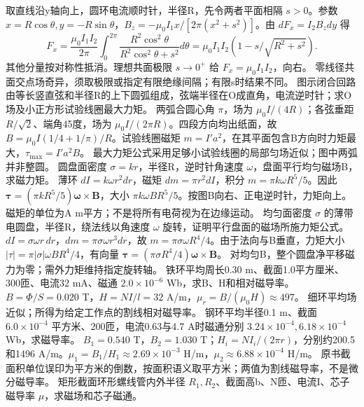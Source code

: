 \workings 取直线沿y轴向上，圆环电流顺时针，半径R，先令两者平面相隔 $s>0$。参数 $x=R\cos\theta,y=-R\sin\theta$，$B_z=-\mu_0I_1x/[2\pi(x^2+s^2)]$。由 $dF_x=I_2B_zdy$ 得
\[
F_x=\frac{\mu_0I_1I_2}{2\pi}\int_0^{2\pi}
\frac{R^2\cos^2\theta}{R^2\cos^2\theta+s^2}d\theta
=\mu_0I_1I_2(1-s/\sqrt{R^2+s^2}).
\]
其他分量按对称性抵消。理想共面极限 $s\to0^+$ 给 $F_x=\mu_0I_1I_2$，向右。
\crosscheck 零线径共面交点场奇异，须取极限或指定有限绝缘间隔；有限s时结果不同。
\problemtext 图示闭合回路由等长竖直弦和半径R的上下圆弧组成，弦端半径在O成直角，电流逆时针；求O场及小正方形试验线圈最大力矩。
\workings 两弧合圆心角 $\pi$，场为 $\mu_0I/(4R)$；各弦垂距 $R/\sqrt2$、端角45度，场为 $\mu_0I/(2\pi R)$。四段方向均出纸面，故 $B=\mu_0I(1/4+1/\pi)/R$。试验线圈磁矩 $m=I'a^2$，在其平面包含B方向时力矩最大，$\tau_{\max}=I'a^2B$。
\crosscheck 最大力矩公式采用足够小试验线圈的局部匀场近似；图中两弧并非整圆。
\problemtext 圆盘面密度 $\sigma=kr$，半径R，逆时针角速度 $\omega$，盘面平行均匀磁场B，求磁力矩。
\workings 薄环 $dI=k\omega r^2dr$，磁矩 $dm=\pi r^2dI$，积分 $m=\pi k\omega R^5/5$。因此 $\bm\tau=(\pi kR^5/5)\bm\omega\times\bm B$，大小 $\pi k\omega BR^5/5$。按图B向右、正电逆时针，力矩向上。
\crosscheck 磁矩的单位为A m平方；不是将所有电荷视为在边缘运动。
\problemtext 均匀面密度 $\sigma$ 的薄带电圆盘，半径R，绕法线以角速度 $\omega$ 旋转，证明平行盘面的磁场所施力矩公式。
\workings $dI=\sigma\omega r\,dr$，$dm=\pi\sigma\omega r^3dr$，故 $m=\pi\sigma\omega R^4/4$。由于法向与B垂直，力矩大小 $|\tau|=\pi|\sigma|\omega BR^4/4$，有向量 $\bm\tau=(\pi\sigma R^4/4)\bm\omega\times\bm B$。
\crosscheck 对均匀B，整个圆盘净平移磁力为零；需外力矩维持指定旋转轴。
\problemtext 铁环平均周长0.30 m、截面1.0平方厘米、300匝、电流32 mA、磁通 $2.0\times10^{-6}$ Wb，求B、H和相对磁导率。
\workings $B=\Phi/S=0.020$ T，$H=NI/l=32$ A/m，$\mu_r=B/(\mu_0H)\approx497$。
\crosscheck 细环平均场近似；所得为给定工作点的割线相对磁导率。
\problemtext 钢环平均半径0.1 m、截面 $6.0\times10^{-4}$ 平方米、200匝，电流0.63与4.7 A时磁通分别 $3.24\times10^{-4},6.18\times10^{-4}$ Wb，求磁导率。
\workings $B_1=0.540$ T，$B_2=1.030$ T；$H_i=NI_i/(2\pi r)$，分别约200.5和1496 A/m。$\mu_1=B_1/H_1\approx2.69\times10^{-3}$ H/m，$\mu_2\approx6.88\times10^{-4}$ H/m。
\crosscheck 原书截面积单位误印为平方米的倒数，按面积语义取平方米；两值为割线磁导率，不是微分磁导率。
\problemtext 矩形截面环形螺线管内外半径 $R_1,R_2$、截面高b、N匝、电流I、芯子磁导率 $\mu$，求磁场和芯子磁通。
